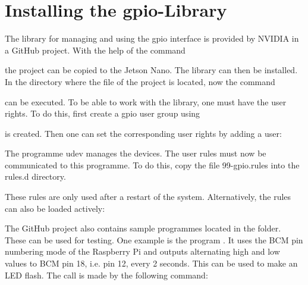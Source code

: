 \section{Installing the  \ac{gpio}-Library}

The library for managing and using the \ac{gpio} interface is provided by NVIDIA in a GitHub project. With the help of the command 


\medskip
{}
\medskip

the project can be copied to the Jetson Nano. The library can then be installed. In the directory where the  file of the project is located, now the command



\medskip
{}
\medskip

can be executed. To be able to work with the library, one must have the user rights. To do this, first create a \ac{gpio} user group using

\medskip
{} \newline
\medskip


is created. Then one can set the corresponding user rights by adding a user:

\medskip
{}
\medskip

The programme udev manages the devices. The user rules must now be communicated to this programme. To do this, copy the file 99-gpio.rules into the rules.d directory.

\medskip
{}
\medskip

These rules are only used after a restart of the system. Alternatively, the rules can also be loaded actively:

\medskip
{}
\medskip

The GitHub project also contains sample programmes located in the  folder. These can be used for testing.  One example is the program . It uses the BCM pin numbering mode of the Raspberry Pi and outputs alternating high and low values to BCM pin 18, i.e. pin 12, every 2 seconds. This can be used to make an LED flash. The call is made by the following command:

\medskip
{}
\medskip

